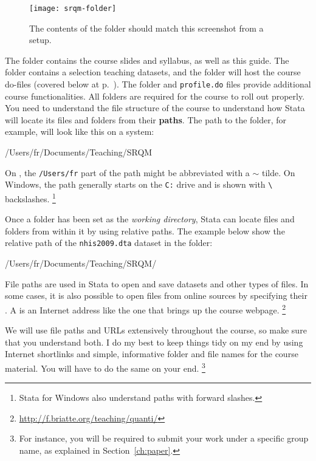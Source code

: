 		\begin{figure}%
		  \texttt{[image: srqm-folder]}
		  \caption{The contents of the \SRQM folder should match %
			this screenshot from a \OSX setup.}
		  \label{fig:srqm-folder}
		\end{figure}
		
	The \course folder contains the course slides and syllabus, as well as this guide. The \data folder contains a selection teaching datasets, and the \code folder will host the course do-files (covered below at p.~\pageref{sec:do-files}). The \setup folder and \texttt{profile.do} files provide additional course functionalities. All folders are required for the course to roll out properly.%
	You need to understand the file structure of the course to understand how Stata will locate its files and folders from their \textbf{paths}. The path to the \SRQM folder, for example, will look like this on a \OSX system:\\[1em]%
	
	\begin{docspec}
		/Users/fr/Documents/Teaching/SRQM
	\end{docspec}
	
	On \OSX, the \texttt{/Users/fr} part of the path might be abbreviated with a \texttt{$\sim$} tilde. On Windows, the path generally starts on the \texttt{C:} drive and is shown with \texttt{\textbackslash} backslashes.%
		\footnote{Stata for Windows also understand paths with forward slashes.}%
	
	Once a folder has been set as the \emph{working directory}, Stata can locate files and folders from within it by using relative paths. The example below show the relative path of the \texttt{nhis2009.dta} dataset in the \texttt{\data} folder:\\[1em]%
	
	\begin{docspec}
		/Users/fr/Documents/Teaching/SRQM/
	\end{docspec}

	File paths are used in Stata to open and save datasets and other types of files. In some cases, it is also possible to open files from online sources by specifying their \URL. A \URL is an Internet address like the one that brings up the course webpage.%
		\footnote{\url{http://f.briatte.org/teaching/quanti/}}%
	
	We will use file paths and URLs extensively throughout the course, so make sure that you understand both. I do my best to keep things tidy on my end by using Internet shortlinks and simple, informative folder and file names for the course material. You will have to do the same on your end.%
		\footnote{For instance, you will be required to submit your work under a specific group name, as explained in Section~\ref{ch:paper}.}%

